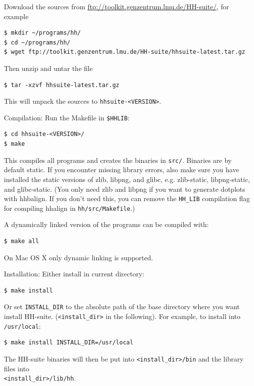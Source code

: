 \documentclass[11pt,a4paper]{article}
\begin{document}
\begin{enum}

\item Download the sources from \url{ftp://toolkit.genzentrum.lmu.de/HH-suite/}, for example
\begin{verbatim}
$ mkdir ~/programs/hh/
$ cd ~/programs/hh/
$ wget ftp://toolkit.genzentrum.lmu.de/HH-suite/hhsuite-latest.tar.gz 
\end{verbatim}
\vspace{2mm}


\item Then unzip and untar the file
\begin{verbatim}
$ tar -xzvf hhsuite-latest.tar.gz
\end{verbatim}
This will unpack the sources to \verb`hhsuite-<VERSION>`.
\vspace{2mm}


\item Compilation: Run the Makefile in \verb`$HHLIB`:
\begin{verbatim}
$ cd hhsuite-<VERSION>/
$ make
\end{verbatim}
This compiles all programs and creates the binaries in \verb`src/`. Binaries are by default static. If you encounter
missing library errors, also make sure you have installed the static versions of zlib, libpng, and glibc, e.g. zlib-static, libpng-static, and glibc-static. (You only need zlib and libpng if you want to generate dotplots with hhbalign. If you don't need this, you can remove the \verb`HH_LIB` compilation flag for compiling hhalign in \verb`hh/src/Makefile`.)

A dynamically linked version of the programs can be compiled with:
\begin{verbatim}
$ make all
\end{verbatim}
On Mac OS X only dynamic linking is supported.
\vspace{2mm}


\item Installation: Either install in current directory:
\begin{verbatim}
$ make install
\end{verbatim}
Or set \verb`INSTALL_DIR` to the absolute path of the base directory where you want install HH-suite.
(\verb`<install_dir>` in the following). For example, to install into \verb`/usr/local`:
\begin{verbatim}
$ make install INSTALL_DIR=/usr/local
\end{verbatim}
The HH-suite binaries will then be put into \verb`<install_dir>/bin` and the library files into\\
\verb`<install_dir>/lib/hh`.
\vspace{2mm}



\end{enum}
\end{document}

